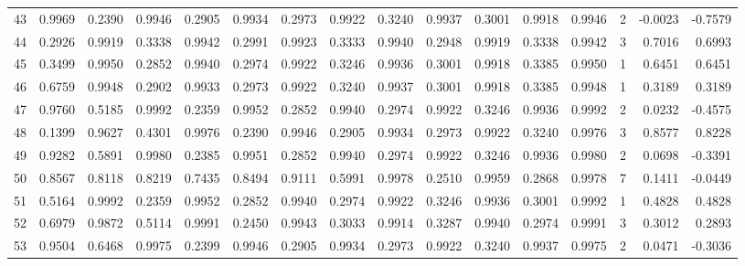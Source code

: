 \begin{tabular}{lrrrrrrrrrrrrrrr}
43  &      0.9969 &  0.2390 &  0.9946 &  0.2905 &  0.9934 &  0.2973 &  0.9922 &  0.3240 &  0.9937 &  0.3001 &   0.9918 &     0.9946 &      2 &                   -0.0023 &                    -0.7579 \\
44  &      0.2926 &  0.9919 &  0.3338 &  0.9942 &  0.2991 &  0.9923 &  0.3333 &  0.9940 &  0.2948 &  0.9919 &   0.3338 &     0.9942 &      3 &                    0.7016 &                     0.6993 \\
45  &      0.3499 &  0.9950 &  0.2852 &  0.9940 &  0.2974 &  0.9922 &  0.3246 &  0.9936 &  0.3001 &  0.9918 &   0.3385 &     0.9950 &      1 &                    0.6451 &                     0.6451 \\
46  &      0.6759 &  0.9948 &  0.2902 &  0.9933 &  0.2973 &  0.9922 &  0.3240 &  0.9937 &  0.3001 &  0.9918 &   0.3385 &     0.9948 &      1 &                    0.3189 &                     0.3189 \\
47  &      0.9760 &  0.5185 &  0.9992 &  0.2359 &  0.9952 &  0.2852 &  0.9940 &  0.2974 &  0.9922 &  0.3246 &   0.9936 &     0.9992 &      2 &                    0.0232 &                    -0.4575 \\
48  &      0.1399 &  0.9627 &  0.4301 &  0.9976 &  0.2390 &  0.9946 &  0.2905 &  0.9934 &  0.2973 &  0.9922 &   0.3240 &     0.9976 &      3 &                    0.8577 &                     0.8228 \\
49  &      0.9282 &  0.5891 &  0.9980 &  0.2385 &  0.9951 &  0.2852 &  0.9940 &  0.2974 &  0.9922 &  0.3246 &   0.9936 &     0.9980 &      2 &                    0.0698 &                    -0.3391 \\
50  &      0.8567 &  0.8118 &  0.8219 &  0.7435 &  0.8494 &  0.9111 &  0.5991 &  0.9978 &  0.2510 &  0.9959 &   0.2868 &     0.9978 &      7 &                    0.1411 &                    -0.0449 \\
51  &      0.5164 &  0.9992 &  0.2359 &  0.9952 &  0.2852 &  0.9940 &  0.2974 &  0.9922 &  0.3246 &  0.9936 &   0.3001 &     0.9992 &      1 &                    0.4828 &                     0.4828 \\
52  &      0.6979 &  0.9872 &  0.5114 &  0.9991 &  0.2450 &  0.9943 &  0.3033 &  0.9914 &  0.3287 &  0.9940 &   0.2974 &     0.9991 &      3 &                    0.3012 &                     0.2893 \\
53  &      0.9504 &  0.6468 &  0.9975 &  0.2399 &  0.9946 &  0.2905 &  0.9934 &  0.2973 &  0.9922 &  0.3240 &   0.9937 &     0.9975 &      2 &                    0.0471 &                    -0.3036 \\

\end{tabular}
